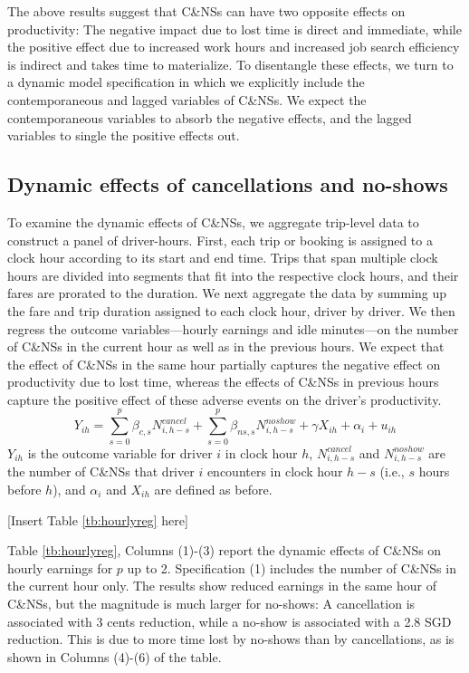 \documentclass[reviewmode]{AEA}
\begin{document}
The above results suggest that C\&NSs can have two opposite effects on productivity: The negative impact due to lost time is direct and immediate, while the positive effect due to increased work hours and increased job search efficiency is indirect and takes time to materialize. To disentangle these effects, we turn to a dynamic model specification in which we explicitly include the contemporaneous and lagged variables of C\&NSs. We expect the contemporaneous variables to absorb the negative effects, and the lagged variables to single the positive effects out.



\subsection{Dynamic effects of cancellations and no-shows}
To examine the dynamic effects of C\&NSs, we aggregate trip-level data to construct a panel of driver-hours. First, each trip or booking is assigned to a clock hour according to its start and end time. Trips that span multiple clock hours are divided into segments that fit into the respective clock hours, and their fares are prorated to the duration. We next aggregate the data by summing up the fare and trip duration assigned to each clock hour, driver by driver. We then regress the outcome variables---hourly earnings and idle minutes---on the number of C\&NSs in the current hour as well as in the previous hours. We expect that the effect of C\&NSs in the same hour partially captures the negative effect on productivity due to lost time, whereas the effects of C\&NSs in previous hours capture the positive effect of these adverse events on the driver's productivity.
\begin{equation}
Y_{ih} = \sum_{s=0}^p \beta_{c,s} N^{cancel}_{i,h-s} + \sum_{s=0}^p \beta_{ns,s} N^{noshow}_{i,h-s} + \gamma X_{ih} + \alpha_i + u_{ih}
\end{equation}
$Y_{ih}$ is the outcome variable for driver $i$ in clock hour $h$, $N^{cancel}_{i, h-s}$ and $N^{noshow}_{i, h-s}$ are the number of C\&NSs that driver $i$ encounters in clock hour $h-s$ (i.e., $s$ hours before $h$), and $\alpha_i$ and $X_{ih}$ are defined as before.

\begin{center}
	[Insert Table \ref{tb:hourlyreg} here]
\end{center}

Table \ref{tb:hourlyreg}, Columns (1)-(3) report the dynamic effects of C\&NSs on hourly earnings for $p$ up to 2. Specification (1) includes the number of C\&NSs in the current hour only. The results show reduced earnings in the same hour of C\&NSs, but the magnitude is much larger for no-shows: A cancellation is associated with 3 cents reduction, while a no-show is associated with a 2.8 SGD reduction. This is due to more time lost by no-shows than by cancellations, as is shown in Columns (4)-(6) of the table. 
\end{document}

